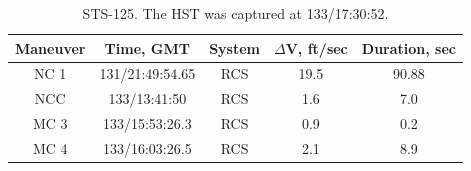 \documentclass[paper=letter, fontsize=11pt]{scrartcl} %
\numberwithin{equation}{section} %
\numberwithin{figure}{section} %
\numberwithin{table}{section} %
\begin{document}
\begin{table}[H]
    \begin{center}
        \begin{tabular}{|c |c |c |c |c|}
            \hline
            Maneuver & Time, GMT       & System & $\Delta$V, ft/sec & Duration, sec \\
            \hline
            NC 1     & 131/21:49:54.65 & RCS    & 19.5              & 90.88         \\ \hline
            NCC      & 133/13:41:50    & RCS    & 1.6               & 7.0           \\ \hline
            MC 3     & 133/15:53:26.3  & RCS    & 0.9               & 0.2           \\ \hline
            MC 4     & 133/16:03:26.5  & RCS    & 2.1               & 8.9           \\ \hline
        \end{tabular}
    \end{center}
    \caption{STS-125. The HST was captured at 133/17:30:52.}
\end{table}

\end{document}
